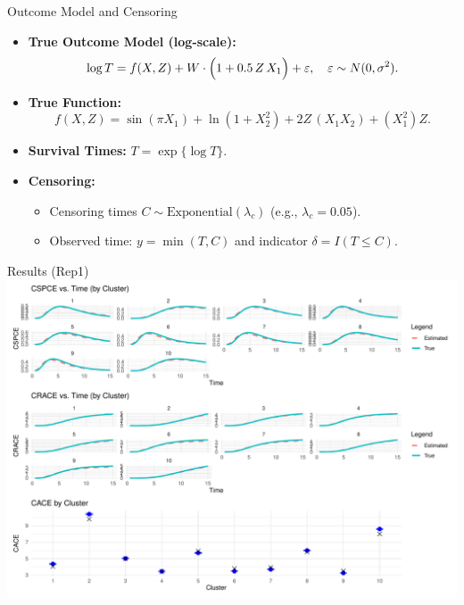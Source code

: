 \begin{frame}{Outcome Model and Censoring}
  \begin{itemize}
    \item \textbf{True Outcome Model (log-scale):}
      \[
      \log T = f(X,Z) + W\cdot\Bigl(1+0.5\,Z\,X_1\Bigr) + \varepsilon,\quad \varepsilon\sim N(0,\sigma^2).
      \]
    \item \textbf{True Function:}
      \[
      f(X,Z) = \sin(\pi X_1) + \ln(1+X_2^2) + 2Z\,(X_1X_2) + (X_1^2)Z.
      \]
    \item \textbf{Survival Times:} \(T = \exp\{\log T\}\).
    \item \textbf{Censoring:} 
      \begin{itemize}
        \item Censoring times \(C \sim \text{Exponential}(\lambda_c)\) (e.g., \(\lambda_c=0.05\)).
        \item Observed time: \(y = \min(T, C)\) and indicator \(\delta = I(T\le C)\).
      \end{itemize}
  \end{itemize}
\end{frame}

\begin{frame}{Results (Rep1)}
    \includegraphics[height=.8\linewidth]{pics/Sim4.pdf}
\end{frame}

